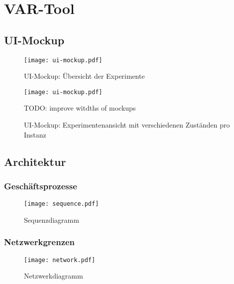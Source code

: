 \chapter{VAR-Tool}
\label{ch:main-matter}
\section{UI-Mockup}
  \begin{figure}
    \centering
    \texttt{[image: ui-mockup.pdf]}
    \par
    \caption{UI-Mockup: Übersicht der Experimente}
    \label{fig:ui-mockup-1}
  \end{figure}
  \begin{figure}
    \centering
    \texttt{[image: ui-mockup.pdf]}
    \par
    \caption{UI-Mockup: Experimentenansicht mit verschiedenen Zuständen pro Instanz}
    TODO: improve witdths of mockups
    \label{fig:ui-mockup-2}
  \end{figure}
\section{Architektur}
\subsection{Geschäftsprozesse}
  \begin{figure}
    \centering
    \texttt{[image: sequence.pdf]}
    \par
    \caption{Sequenzdiagramm}
    \label{fig:sequence}
  \end{figure}
\subsection{Netzwerkgrenzen}
  \begin{figure}
    \centering
    \texttt{[image: network.pdf]}
    \par
    \caption{Netzwerkdiagramm}
    \label{fig:network}
  \end{figure}

